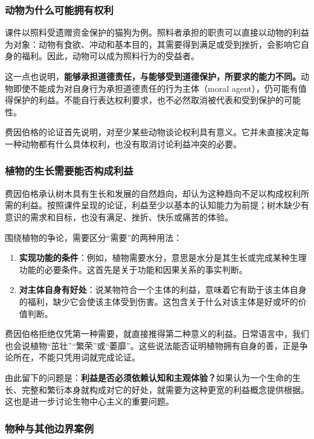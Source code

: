 \documentclass{ctexart}
\begin{document}
\subsubsection{动物为什么可能拥有权利}

课件以照料受遗赠资金保护的猫狗为例。照料者承担的职责可以直接以动物的利益为对象：动物有食欲、冲动和基本目的，其需要得到满足或受到挫折，会影响它自身的福利。因此，动物可以成为照料行为的受益者。

这一点也说明，\textbf{能够承担道德责任，与能够受到道德保护，所要求的能力不同。}动物即使不能成为对自身行为承担道德责任的行为主体（moral agent），仍可能有值得保护的利益。不能自行表达权利要求，也不必然取消被代表和受到保护的可能性。

费因伯格的论证首先说明，对至少某些动物谈论权利具有意义。它并未直接决定每一种动物都有什么具体权利，也没有取消讨论利益冲突的必要。

\subsubsection{植物的生长需要能否构成利益}

费因伯格承认树木具有生长和发展的自然趋向，却认为这种趋向不足以构成权利所需的利益。按照课件呈现的论证，利益至少以基本的认知能力为前提；树木缺少有意识的需求和目标，也没有满足、挫折、快乐或痛苦的体验。

围绕植物的争论，需要区分“需要”的两种用法：

\begin{enumerate}
    \item \textbf{实现功能的条件}：例如，植物需要水分，意思是水分是其生长或完成某种生理功能的必要条件。这首先是关于功能和因果关系的事实判断。
    \item \textbf{对主体自身有好处}：说某物符合一个主体的利益，意味着它有助于该主体自身的福利，缺少它会使该主体受到伤害。这包含关于什么对该主体是好或坏的价值判断。
\end{enumerate}

费因伯格拒绝仅凭第一种需要，就直接推得第二种意义的利益。日常语言中，我们也会说植物“茁壮”“繁荣”或“萎靡”。这些说法能否证明植物拥有自身的善，正是争论所在，不能只凭用词就完成论证。

由此留下的问题是：\textbf{利益是否必须依赖认知和主观体验？}如果认为一个生命的生长、完整和繁衍本身就构成对它的好处，就需要为这种更宽的利益概念提供根据。这也是进一步讨论生物中心主义的重要问题。

\subsubsection{物种与其他边界案例}
\end{document}

